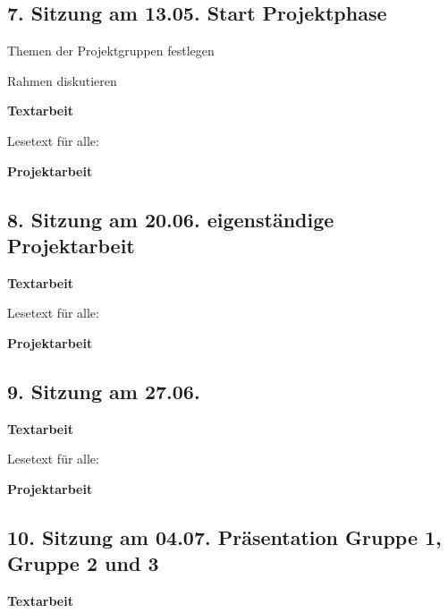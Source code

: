 \documentclass[
  ngerman,
]{article}
\begin{document}
\hypertarget{sitzung-am-13.05.-start-projektphase}{%
\subsection*{7. Sitzung am 13.05. \textbar{} Start Projektphase}\label{sitzung-am-13.05.-start-projektphase}}

Themen der Projektgruppen festlegen

Rahmen diskutieren

\textbf{Textarbeit}

Lesetext für alle:

\textbf{Projektarbeit}

\hypertarget{sitzung-am-20.06.-eigenstuxe4ndige-projektarbeit}{%
\subsection*{8. Sitzung am 20.06. \textbar{} eigenständige Projektarbeit}\label{sitzung-am-20.06.-eigenstuxe4ndige-projektarbeit}}

\textbf{Textarbeit}

Lesetext für alle:

\textbf{Projektarbeit}

\hypertarget{sitzung-am-27.06.}{%
\subsection*{9. Sitzung am 27.06. \textbar{}}\label{sitzung-am-27.06.}}

\textbf{Textarbeit}

Lesetext für alle:

\textbf{Projektarbeit}

\hypertarget{sitzung-am-04.07.-pruxe4sentation-gruppe-1-gruppe-2-und-3}{%
\subsection*{10. Sitzung am 04.07. \textbar{} Präsentation Gruppe 1, Gruppe 2 und 3}\label{sitzung-am-04.07.-pruxe4sentation-gruppe-1-gruppe-2-und-3}}

\textbf{Textarbeit}
\end{document}
